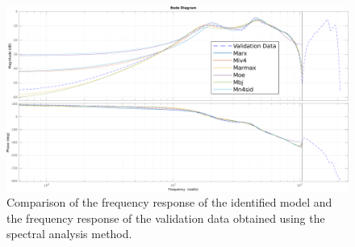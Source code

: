 \begin{figure}[h]
	\centering
	\includegraphics[width=\textwidth]{figures/bode_parametric.pdf}
	\caption{Comparison of the frequency response of the identified model and the frequency response of the validation data obtained using the spectral analysis method.}
	\label{fig:comparison_freq}
\end{figure}

